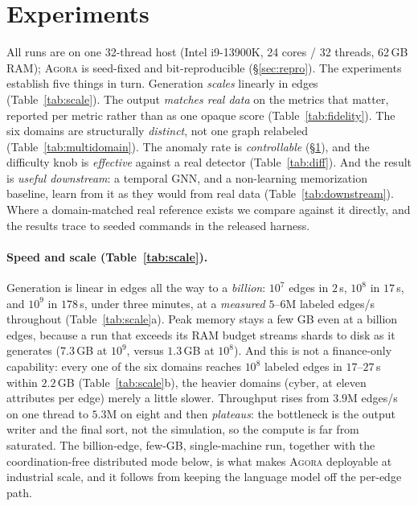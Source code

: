 \documentclass[sigconf,review,anonymous]{acmart}
\newcommand{\sys}{\textsc{Agora}\xspace}
\begin{document}
\section{Experiments}
\label{sec:exp}
All runs are on one 32-thread host (Intel i9-13900K, 24 cores / 32 threads, 62\,GB
RAM); \sys{} is seed-fixed
and bit-reproducible (\S\ref{sec:repro}). The experiments establish five things in
turn. Generation \emph{scales} linearly in edges (Table~\ref{tab:scale}).
The output \emph{matches real data} on the metrics that matter,
reported per metric rather than as one opaque score (Table~\ref{tab:fidelity}). The six
domains are structurally \emph{distinct}, not one graph relabeled
(Table~\ref{tab:multidomain}). The anomaly rate is \emph{controllable}
(\S\ref{sec:exp}), and the difficulty knob is \emph{effective} against a real
detector (Table~\ref{tab:diff}). And the result is \emph{useful downstream}: a temporal
GNN, and a non-learning memorization baseline, learn from it as they would from real
data (Table~\ref{tab:downstream}). Where a domain-matched real reference exists we
compare against it directly, and the results trace to seeded commands in the released
harness.

\paragraph{Speed and scale (Table~\ref{tab:scale}).}
Generation is linear in edges all the way to a \emph{billion}: $10^7$ edges in
$2$\,s, $10^8$ in $17$\,s, and $10^9$ in $178$\,s, under three minutes, at a
\emph{measured} $5$--$6$M labeled edges/s throughout (Table~\ref{tab:scale}a). Peak
memory stays a few GB even at a billion edges, because a run that exceeds its RAM
budget streams shards to disk as it generates ($7.3$\,GB at $10^9$, versus $1.3$\,GB
at $10^8$). And this is not a finance-only capability: every one of the six domains
reaches $10^8$ labeled edges in $17$--$27$\,s within $2.2$\,GB
(Table~\ref{tab:scale}b), the heavier domains (cyber, at eleven attributes per edge)
merely a little slower. Throughput rises from $3.9$M edges/s on one thread to $5.3$M
on eight and then \emph{plateaus}: the bottleneck is the output writer and the final
sort, not the simulation, so the compute is far from saturated. The billion-edge,
few-GB, single-machine run, together with the coordination-free distributed mode below,
is what makes \sys{} deployable at industrial scale, and it follows from keeping the
language model off the per-edge path.
\end{document}
